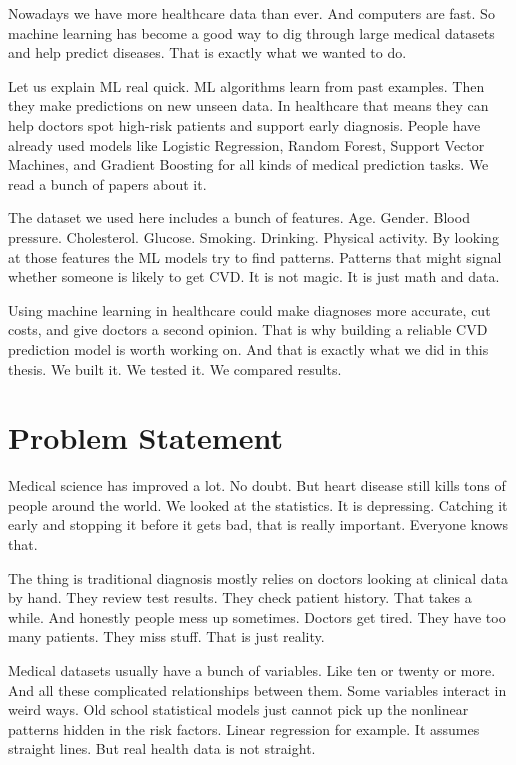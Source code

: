 \documentclass[12pt, a4paper, oneside]{book}
\begin{document}
Nowadays we have more healthcare data than ever. And computers are fast. So machine learning has become a good way to dig through large medical datasets and help predict diseases. That is exactly what we wanted to do.

Let us explain ML real quick. ML algorithms learn from past examples. Then they make predictions on new unseen data. In healthcare that means they can help doctors spot high-risk patients and support early diagnosis. People have already used models like Logistic Regression, Random Forest, Support Vector Machines, and Gradient Boosting for all kinds of medical prediction tasks. We read a bunch of papers about it.

The dataset we used here includes a bunch of features. Age. Gender. Blood pressure. Cholesterol. Glucose. Smoking. Drinking. Physical activity. By looking at those features the ML models try to find patterns. Patterns that might signal whether someone is likely to get CVD. It is not magic. It is just math and data.

Using machine learning in healthcare could make diagnoses more accurate, cut costs, and give doctors a second opinion. That is why building a reliable CVD prediction model is worth working on. And that is exactly what we did in this thesis. We built it. We tested it. We compared results.

\section{Problem Statement}
Medical science has improved a lot. No doubt. But heart disease still kills tons of people around the world. We looked at the statistics. It is depressing. Catching it early and stopping it before it gets bad, that is really important. Everyone knows that.

The thing is traditional diagnosis mostly relies on doctors looking at clinical data by hand. They review test results. They check patient history. That takes a while. And honestly people mess up sometimes. Doctors get tired. They have too many patients. They miss stuff. That is just reality.

Medical datasets usually have a bunch of variables. Like ten or twenty or more. And all these complicated relationships between them. Some variables interact in weird ways. Old school statistical models just cannot pick up the nonlinear patterns hidden in the risk factors. Linear regression for example. It assumes straight lines. But real health data is not straight.
\end{document}
